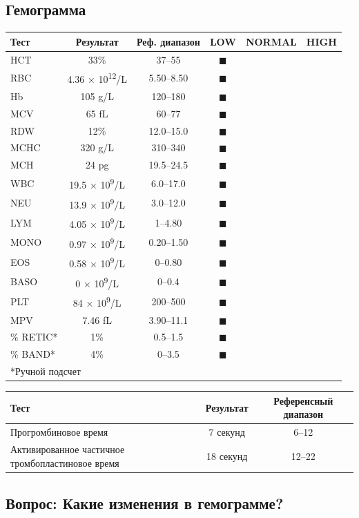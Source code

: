 \documentclass[a4paper,12pt]{book}
\begin{document}
\subsection*{Гемограмма}
\begin{tabular}{lccccc}
\toprule
Тест & Результат & Реф. диапазон & LOW & NORMAL & HIGH \\
\midrule
HCT & 33\% & 37--55 & $\blacksquare$ \\
RBC & 4.36 × 10\textsuperscript{12}/L & 5.50--8.50 & $\blacksquare$ \\
Hb & 105 g/L & 120--180 & $\blacksquare$ \\
MCV & 65 fL & 60--77 & $\blacksquare$ \\
RDW & 12\% & 12.0--15.0 & $\blacksquare$ \\
MCHC & 320 g/L & 310--340 & $\blacksquare$ \\
MCH & 24 pg & 19.5--24.5 & $\blacksquare$ \\
WBC & 19.5 × 10\textsuperscript{9}/L & 6.0--17.0 & $\blacksquare$ \\
NEU & 13.9 × 10\textsuperscript{9}/L & 3.0--12.0 & $\blacksquare$ \\
LYM & 4.05 × 10\textsuperscript{9}/L & 1--4.80 & $\blacksquare$ \\
MONO & 0.97 × 10\textsuperscript{9}/L & 0.20--1.50 & $\blacksquare$ \\
EOS & 0.58 × 10\textsuperscript{9}/L & 0--0.80 & $\blacksquare$ \\
BASO & 0 × 10\textsuperscript{9}/L & 0--0.4 & $\blacksquare$ \\
PLT & 84 × 10\textsuperscript{9}/L & 200--500 & $\blacksquare$ \\
MPV & 7.46 fL & 3.90--11.1 & $\blacksquare$ \\
\% RETIC* & 1\% & 0.5--1.5 & $\blacksquare$ \\
\% BAND* & 4\% & 0--3.5 & $\blacksquare$ \\
\bottomrule
\multicolumn{6}{l}{*Ручной подсчет}
\end{tabular}

\begin{tabular}{lcc}
\toprule
Тест & Результат & Референсный диапазон \\
\midrule
Прогромбиновое время & 7 секунд & 6--12 \\
Активированное частичное тромбопластиновое время & 18 секунд & 12--22 \\
\bottomrule
\end{tabular}

\subsection*{Вопрос: Какие изменения в гемограмме?}
\end{document}
